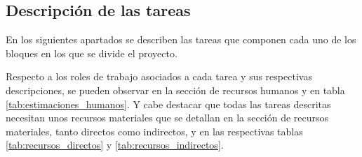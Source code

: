 \subsection{Descripción de las tareas}
En los siguientes apartados se describen las tareas que componen cada uno de los bloques en los que se divide el proyecto.







Respecto a los roles de trabajo asociados a cada tarea y sus respectivas descripciones, se pueden observar en la sección de recursos humanos y en tabla \ref{tab:estimaciones_humanos}.
Y cabe destacar que todas las tareas descritas necesitan unos recursos materiales que se detallan en la sección de recursos materiales, tanto directos como indirectos, y en las respectivas tablas \ref{tab:recursos_directos} y \ref{tab:recursos_indirectos}.

\clearpage